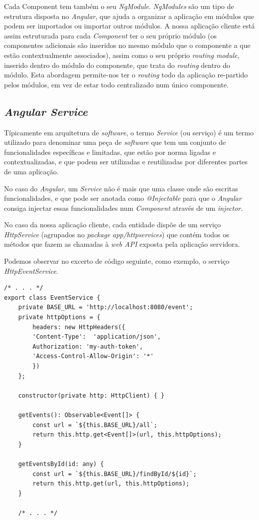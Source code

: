 Cada Component tem também o seu \textit{NgModule}. \textit{NgModules} são um tipo de estrutura disposta no \textit{Angular}, que ajuda a organizar a aplicação em módulos que podem ser importados ou importar outros módulos. A nossa aplicação cliente está assim estruturada para cada \textit{Component} ter o seu próprio módulo (os componentes adicionais são inseridos no mesmo módulo que o componente a que estão contextualmente associados), assim como o seu próprio \textit{routing module}, inserido dentro do módulo do componente, que trata do \textit{routing} dentro do módulo. Esta abordagem permite-nos ter o \textit{routing} todo da aplicação re-partido pelos módulos, em vez de estar todo centralizado num único componente.

\subsection{\textit{Angular Service}}\label{sub412}

Típicamente em arquitetura de \emph{software}, o termo \emph{Service} (ou serviço) é um termo utilizado para denominar uma peça de \emph{software} que tem um conjunto de funcionalidades específicas e limitadas, que estão por norma ligadas e contextualizadas, e que podem ser utilizadas e reutilizadas por diferentes partes de uma aplicação. 

No caso do \emph{Angular}, um \textit{Service} não é mais que uma classe onde são escritas funcionalidades, e que pode ser anotada como \emph{@Injectable} para que o \textit{Angular} consiga injectar essas funcionalidades num \textit{Component} através de um \textit{injector}. 

No caso da nossa aplicação cliente, cada entidade dispõe de um serviço \textit{HttpService} (agrupados no \textit{package} \textit{app/httpservices}) que contém todos os métodos que fazem as chamadas à \textit{web API} exposta pela aplicação servidora. 

Podemos observar no excerto de código seguinte, como exemplo, o serviço \textit{HttpEventService}.

\begin{lstlisting}
/* . . . */
export class EventService {
	private BASE_URL = 'http://localhost:8080/event';
	private httpOptions = {
		headers: new HttpHeaders({
		'Content-Type':  'application/json',
		Authorization: 'my-auth-token',
		'Access-Control-Allow-Origin': '*'
		})
	};

	constructor(private http: HttpClient) { }
	
	getEvents(): Observable<Event[]> {
		const url = `${this.BASE_URL}/all`;
		return this.http.get<Event[]>(url, this.httpOptions);
	}
	
	getEventsById(id: any) {
		const url = `${this.BASE_URL}/findById/${id}`;
		return this.http.get(url, this.httpOptions);
	}
	
	/* . . . */
\end{lstlisting}


